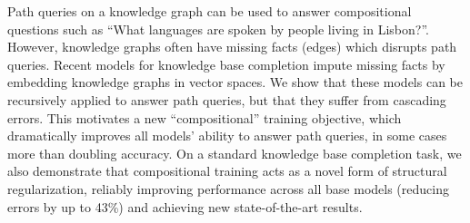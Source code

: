 Path queries on a knowledge graph can be used to answer compositional questions such as ``What languages are spoken by people living in Lisbon?''. However, knowledge graphs often have missing facts (edges) which disrupts path queries. Recent models for knowledge base completion impute missing facts by embedding knowledge graphs in vector spaces. We show that these models can be recursively applied to answer path queries, but that they suffer from cascading errors. This motivates a new ``compositional'' training objective, which dramatically improves all models' ability to answer path queries, in some cases more than doubling accuracy. On a standard knowledge base completion task, we also demonstrate that compositional training acts as a novel form of structural regularization, reliably improving performance across all base models (reducing errors by up to 43\%) and achieving new state-of-the-art results.
